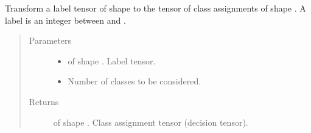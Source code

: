 \documentclass[letterpaper,10pt,english]{sphinxmanual}
\begin{document}
\begin{fulllineitems}
\label{\detokenize{pusion.util.transformer:pusion.util.transformer.transform_label_tensor_to_class_assignment_tensor}}
\sphinxAtStartPar
Transform a label tensor of shape  to the tensor of class assignments of shape
. A label is an integer between  and .
\begin{quote}\begin{description}
\item[{Parameters}] \leavevmode\begin{itemize}
\item {} 
\sphinxAtStartPar
{} \textendash{}  of shape . Label tensor.

\item {} 
\sphinxAtStartPar
{} \textendash{} Number of classes to be considered.

\end{itemize}

\item[{Returns}] \leavevmode
\sphinxAtStartPar
{} of shape . Class assignment tensor (decision tensor).

\end{description}\end{quote}

\end{fulllineitems}

\end{document}
